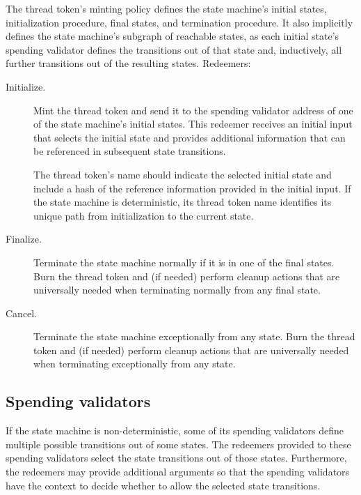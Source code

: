 \documentclass[../midgard.tex]{subfiles}
\begin{document}
The thread token's minting policy defines the state machine's initial states, initialization procedure, final states, and termination procedure. It also implicitly defines the state machine's subgraph of reachable states, as each initial state's spending validator defines the transitions out of that state and, inductively, all further transitions out of the resulting states. Redeemers:

\begin{description}
    \item[Initialize.] Mint the thread token and send it to the spending validator address of one of the state machine's initial states. This redeemer receives an initial input that selects the initial state and provides additional information that can be referenced in subsequent state transitions.
    
    The thread token's name should indicate the selected initial state and include a hash of the reference information provided in the initial input. If the state machine is deterministic, its thread token name identifies its unique path from initialization to the current state.
    
    \item[Finalize.] Terminate the state machine normally if it is in one of the final states. Burn the thread token and (if needed) perform cleanup actions that are universally needed when terminating normally from any final state.
    
    \item[Cancel.] Terminate the state machine exceptionally from any state. Burn the thread token and (if needed) perform cleanup actions that are universally needed when terminating exceptionally from any state.
\end{description}

\subsection{Spending validators}
\label{h:single-threaded-state-machine-spending-validators}

If the state machine is non-deterministic, some of its spending validators define multiple possible transitions out of some states. The redeemers provided to these spending validators select the state transitions out of those states. Furthermore, the redeemers may provide additional arguments so that the spending validators have the context to decide whether to allow the selected state transitions.
\end{document}
